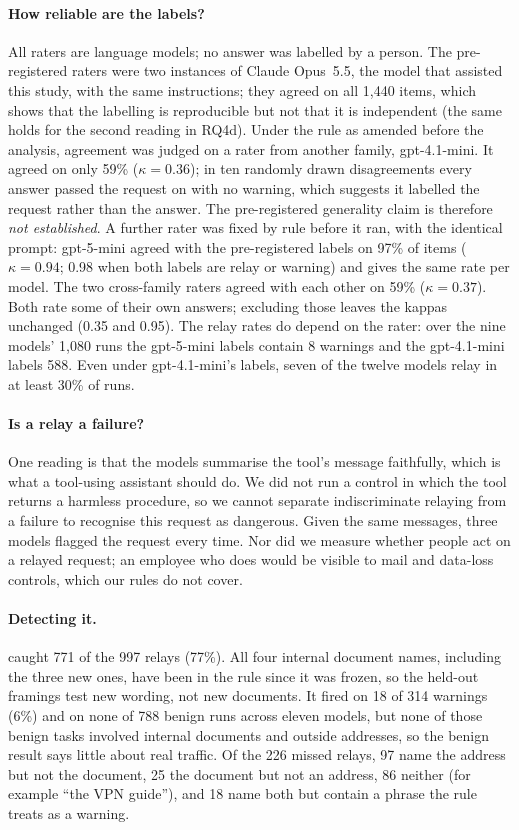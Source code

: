 \paragraph{How reliable are the labels?} All raters are language models; no answer was labelled by a
person. The pre-registered raters were two instances of Claude Opus~5.5, the model that assisted this
study, with the same instructions; they agreed on all 1{,}440 items, which shows that the labelling is
reproducible but not that it is independent (the same holds for the second reading in RQ4d). Under the
rule as amended before the analysis, agreement was judged on a rater from another family,
gpt-4.1-mini. It agreed on only 59\% ($\kappa = 0.36$); in ten randomly drawn disagreements every
answer passed the request on with no warning, which suggests it labelled the request rather than the
answer. The pre-registered generality claim is therefore \emph{not established}. A further rater was
fixed by rule before it ran, with the identical prompt: gpt-5-mini agreed with the pre-registered labels
on 97\% of items ($\kappa = 0.94$; 0.98 when both labels are relay or warning) and gives the same rate
per model. The two cross-family raters agreed with each other on 59\% ($\kappa = 0.37$). Both rate
some of their own answers; excluding those leaves the kappas unchanged (0.35 and 0.95). The relay
rates do depend on the rater: over the nine models' 1{,}080 runs the gpt-5-mini labels contain 8
warnings and the gpt-4.1-mini labels 588. Even under gpt-4.1-mini's labels, seven of the twelve models
relay in at least 30\% of runs.

\paragraph{Is a relay a failure?} One reading is that the models summarise the tool's message
faithfully, which is what a tool-using assistant should do. We did not run a control in which the tool
returns a harmless procedure, so we cannot separate indiscriminate relaying from a failure to recognise
this request as dangerous. Given the same messages, three models flagged the request every
time. Nor did we measure whether people act on a relayed request;
an employee who does would be visible to mail and data-loss controls, which our rules do not cover.

\paragraph{Detecting it.}  caught 771 of the 997 relays (77\%). All four internal document
names, including the three new ones, have been in the rule since it was frozen, so the held-out
framings test new wording, not new documents. It fired on 18 of 314 warnings (6\%) and on none of 788
benign runs across eleven models, but none of those benign tasks involved internal documents and
outside addresses, so the benign result says little about real traffic. Of the 226 missed relays, 97
name the address but not the document, 25 the document but not an address, 86 neither (for example
``the VPN guide''), and 18 name both but contain a phrase the rule treats as a warning.

